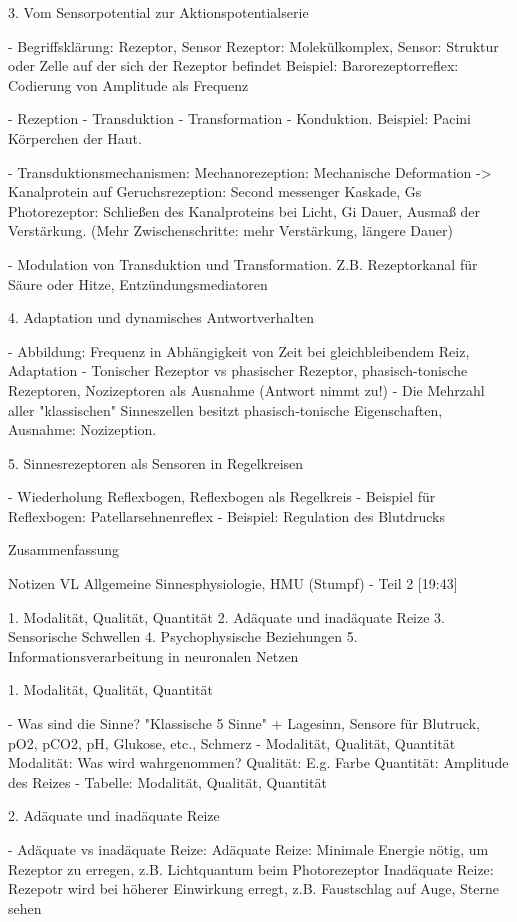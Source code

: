 3. Vom Sensorpotential zur Aktionspotentialserie

- Begriffsklärung: Rezeptor, Sensor
    Rezeptor: Molekülkomplex, Sensor: Struktur oder Zelle auf der sich der Rezeptor befindet
    Beispiel: Barorezeptorreflex: Codierung von Amplitude als Frequenz

- Rezeption - Transduktion - Transformation - Konduktion. Beispiel: Pacini Körperchen der Haut. 

- Transduktionsmechanismen:
    Mechanorezeption: Mechanische Deformation -> Kanalprotein auf
    Geruchsrezeption: Second messenger Kaskade, Gs
    Photorezeptor: Schließen des Kanalproteins bei Licht, Gi
    Dauer, Ausmaß der Verstärkung. (Mehr Zwischenschritte: mehr Verstärkung, längere Dauer)
    
- Modulation von Transduktion und Transformation. Z.B. Rezeptorkanal für Säure oder Hitze, Entzündungsmediatoren

4. Adaptation und dynamisches Antwortverhalten

- Abbildung: Frequenz in Abhängigkeit von Zeit bei gleichbleibendem Reiz, Adaptation
- Tonischer Rezeptor vs phasischer Rezeptor, phasisch-tonische Rezeptoren, Nozizeptoren als Ausnahme (Antwort nimmt zu!)
- Die Mehrzahl aller "klassischen" Sinneszellen besitzt phasisch-tonische Eigenschaften, Ausnahme: Nozizeption.


5. Sinnesrezeptoren als Sensoren in Regelkreisen

- Wiederholung Reflexbogen, Reflexbogen als Regelkreis
- Beispiel für Reflexbogen: Patellarsehnenreflex
- Beispiel: Regulation des Blutdrucks

Zusammenfassung


Notizen VL Allgemeine Sinnesphysiologie, HMU (Stumpf) - Teil 2 [19:43]

 
1. Modalität, Qualität, Quantität
2. Adäquate und inadäquate Reize
3. Sensorische Schwellen
4. Psychophysische Beziehungen
5. Informationsverarbeitung in neuronalen Netzen

1. Modalität, Qualität, Quantität

- Was sind die Sinne? "Klassische 5 Sinne" + Lagesinn, Sensore für Blutruck, pO2, pCO2, pH, Glukose, etc., Schmerz
- Modalität, Qualität, Quantität
    Modalität: Was wird wahrgenommen? 
    Qualität: E.g. Farbe
    Quantität: Amplitude des Reizes
- Tabelle: Modalität, Qualität, Quantität

2. Adäquate und inadäquate Reize

- Adäquate vs inadäquate Reize:
    Adäquate Reize: Minimale Energie nötig, um Rezeptor zu erregen, z.B. Lichtquantum beim Photorezeptor
    Inadäquate Reize: Rezepotr wird bei höherer Einwirkung erregt, z.B. Faustschlag auf Auge, Sterne sehen 

